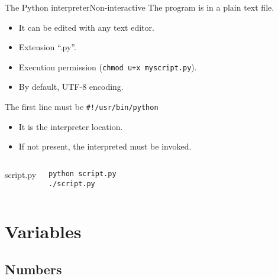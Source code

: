 \documentclass[10pt,compress]{beamer} %
\begin{document}
\begin{frame}[fragile]{The Python interpreter}{Non-interactive}
	The program is in a plain text file.
		\begin{itemize}
		\item It can be edited with any text editor.
		\item Extension ``.py''.
		\item Execution permission (\texttt{chmod u+x myscript.py}).
		\item By default, UTF-8 encoding.
		\end{itemize}
	The first line must be \texttt{\#!/usr/bin/python}
		\begin{itemize}
		\item It is the interpreter location.
		\item If not present, the interpreted must be invoked.
		\end{itemize}

    \begin{columns}
	
		\vspace{-0.2cm}
		\begin{block}{script.py}
		\vspace{-0.2cm}
			
		\end{block}

    	\begin{block}{}
\begin{verbatim}
python script.py
./script.py
\end{verbatim}
		\end{block}
	\end{columns}
\end{frame}

\section{Variables}
\subsection{Numbers}
\end{document}
